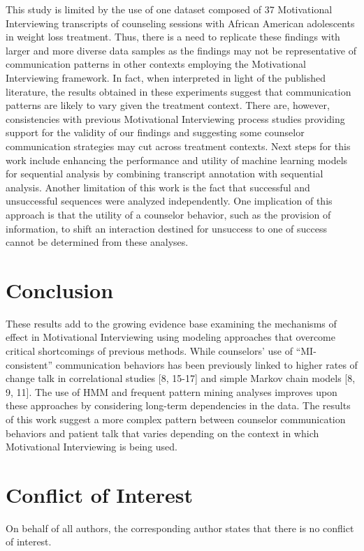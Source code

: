 This study is limited by the use of one dataset composed of 37 Motivational Interviewing transcripts of counseling sessions with African American adolescents in weight loss treatment. Thus, there is a need to replicate these findings with larger and more diverse data samples as the findings may not be representative of communication patterns in other contexts employing the Motivational Interviewing framework. In fact, when interpreted in light of the published literature, the results obtained in these experiments suggest that communication patterns are likely to vary given the treatment context. There are, however, consistencies with previous Motivational Interviewing process studies providing support for the validity of our findings and suggesting some counselor communication strategies may cut across treatment contexts. Next steps for this work include enhancing the performance and utility of machine learning models for sequential analysis by combining transcript annotation with sequential analysis. Another limitation of this work is the fact that successful and unsuccessful sequences were analyzed independently. One implication of this approach is that the utility of a counselor behavior, such as the provision of information, to shift an interaction destined for unsuccess to one of success cannot be determined from these analyses.

\section{Conclusion}
\label{sec:conclusion}
These results add to the growing evidence base examining the mechanisms of effect in Motivational Interviewing using modeling approaches that overcome critical shortcomings of previous methods. While counselors’ use of “MI-consistent” communication behaviors has been previously linked to higher rates of change talk in correlational studies [8, 15-17] and simple Markov chain models [8, 9, 11]. The use of HMM and frequent pattern mining analyses improves upon these approaches by considering long-term dependencies in the data. The results of this work suggest a more complex pattern between counselor communication behaviors and patient talk that varies depending on the context in which Motivational Interviewing is being used. 

\section{Conflict of Interest}
\label{sec:conflictofInterest}
On behalf of all authors, the corresponding author states that there is no conflict of interest.

